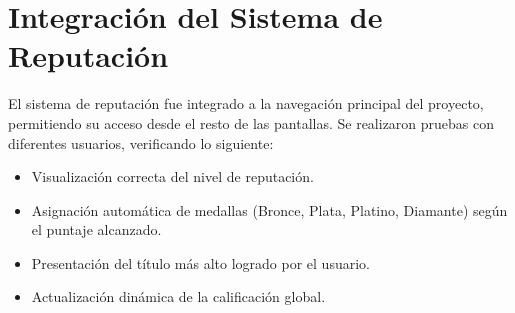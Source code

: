\documentclass[11pt, a4paper, oneside]{book}
\begin{document}
\section{Integración del Sistema de Reputación}

El sistema de reputación fue integrado a la navegación principal del proyecto, permitiendo su acceso desde el resto de las pantallas. Se realizaron pruebas con diferentes usuarios, verificando lo siguiente:

\begin{itemize}
    \item Visualización correcta del nivel de reputación.
    \item Asignación automática de medallas (Bronce, Plata, Platino, Diamante) según el puntaje alcanzado.
    \item Presentación del título más alto logrado por el usuario.
    \item Actualización dinámica de la calificación global.
\end{itemize}
\end{document}
